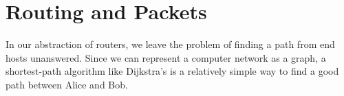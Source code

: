 \section{Routing and Packets}

In our abstraction of routers, we leave the problem of finding
a path from end hosts unanswered. Since we can represent a computer
network as a graph, a shortest-path algorithm like Dijkstra's is a
relatively simple way to find a good path between Alice and Bob.